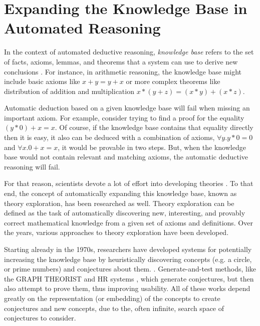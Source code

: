 
\section{Expanding the Knowledge Base in Automated Reasoning}

In the context of automated deductive reasoning, \emph{knowledge base} refers to the set of facts, axioms, lemmas, and theorems that a system can use to derive new conclusions \cite{amlenat1977automated, thesy}.
For instance, in arithmetic reasoning, the knowledge base might include basic axioms like $x + y = y + x$ or more complex theorems like distribution of addition and multiplication $x * (y + z) = (x * y) + (x * z)$.

Automatic deduction based on a given knowledge base will fail when missing an important axiom.
For example, consider trying to find a proof for the equality $(y * 0) + x = x$.
Of course, if the knowledge base contains that equality directly then it is easy, it also can be deduced with a combination of axioms, $\forall y. y * 0 = 0$ and $\forall x. 0 + x = x$, it would be provable in two steps.
But, when the knowledge base would not contain relevant and matching axioms, the automatic deductive reasoning will fail.

For that reason, scientists devote a lot of effort into developing theories \cite{qedatlarge}.
To that end, the concept of automatically expanding this knowledge base, known as theory exploration, has been researched as well.
Theory exploration can be defined as the task of automatically discovering new, interesting, and provably correct mathematical knowledge from a given set of axioms and definitions.
Over the years, various approaches to theory exploration have been developed.

Starting already in the 1970s, researchers have developed systems for potentially increasing the knowledge base by heuristically discovering concepts (e.g. a circle, or prime numbers) and conjectures about them. \cite{amlenat1977automated,buchanan1981dendral}.
Generate-and-test methods, like the GRAPH THEORIST and HR systems \cite{epstein1988graphtheist,colton1999automatichr}, which generate conjectures, but then also attempt to prove them, thus improving usability.
All of these works depend greatly on the representation (or embedding) of the concepts to create conjectures and new concepts, due to the, often infinite, search space of conjectures to consider.


